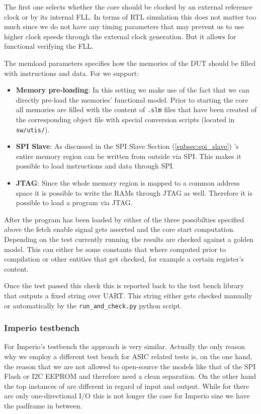 The first one selects whether the core should be clocked by an external reference clock or by its internal FLL. In terms of RTL simulation this does not matter too much since we do not have any timing parameters that may prevent us to use higher clock speeds through the external clock generation. But it allows for functional verifying the FLL.

The memload parameters specifies how the memories of the DUT should be filled with instructions and data. For \pulpino we support:
\begin{itemize}
    \item \textbf{Memory pre-loading}: In this setting we make use of the fact that we can directly pre-load the memories' functional model. Prior to starting the core all memories are filled with the content of \verb+.slm+ files that have been created of the corresponding object file with special conversion scripts (located in \verb+sw/utis/+).
    \item \textbf{SPI Slave}: As discussed in the SPI Slave Section (\ref{subsec:spi_slave}) \pulpino's entire memory region can be written from outside via SPI. This makes it possible to load instructions and data through SPI.
    \item \textbf{JTAG}: Since the whole memory region is mapped to a common address space it is possible to write the RAMs through JTAG as well. Therefore it is possible to load a program via JTAG.
\end{itemize}

After the program has been loaded by either of the three possibilties specified above the fetch enable signal gets asserted and the core start computation. Depending on the test currently running the results are checked against a golden model.  This can either be some constants that where computed prior to compilation or other entities that get checked, for example a certain register's content.

Once the test passed this check this is reported back to the test bench library that outputs a fixed string over UART. This string either gets checked manually or automatically by the \verb+run_and_check.py+ python script.

\subsubsection{Imperio testbench}

For Imperio's testbench the approach is very similar. Actually the only reason why we employ a different test bench for ASIC related tests is, on the one hand, the reason that we are not allowed to open-source the models like that of the SPI Flash or I2C EEPROM and therefore need a clean separation. On the other hand the top instances of \pulpino are different in regard of input and output. While for \pulpino there are only one-directional I/O this is not longer the case for Imperio sine we have the padframe in between.

